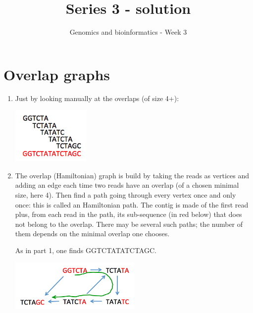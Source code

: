 \documentclass[a4paper,11pt]{article}
\title{Series 3 - solution}
\date{}
\author{Genomics and bioinformatics - Week 3}
\begin{document}
\maketitle

\section{Overlap graphs}

\begin{enumerate}
\item Just by looking manually at the overlaps (of size 4+):

\begin{center}
\includegraphics[width=0.3\textwidth]{byhand.png}\\
\end{center}

\item The overlap (Hamiltonian) graph is build by taking the reads as vertices and adding an edge each time two reads have an overlap (of a chosen minimal size, here 4). Then find a path going through every vertex once and only once: this is called an Hamiltonian path. The contig is made of the first read plus, from each read in the path, its sub-sequence (in red below) that does not belong to the overlap. There may be several such paths; the number of them depends on the minimal overlap one chooses.

As in part 1, one finds GGTCTATATCTAGC.

\begin{center}
\includegraphics[width=0.5\textwidth]{hamiltonian.png}\\
\end{center}


\end{enumerate}
\end{document}
